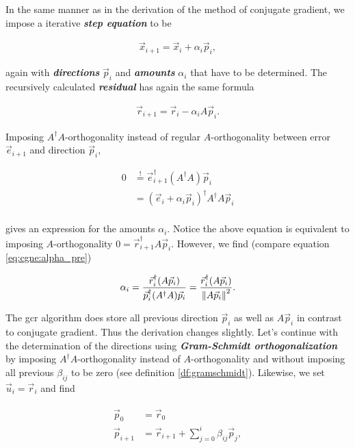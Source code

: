 \documentclass{article}
\theoremstyle{plain} %
\theoremstyle{convention} %
\theoremstyle{remark} %
\def\df#1{\textbf{\textit{#1}}}
\numberwithin{equation}{section}
\begin{document}
In the same manner as in the derivation of the method of conjugate gradient, we impose a iterative \df{step equation} to be

\begin{align*}
    \vec{x}_{i+1} = \vec{x}_i + \alpha_i \vec{p}_i,
\end{align*}

again with \df{directions} $\vec{p}_i$ and \df{amounts} $\alpha_i$ that have to be determined. The recursively calculated \df{residual} has again the same formula

\begin{align*}
    \vec{r}_{i+1} = \vec{r}_i - \alpha_i A \vec{p}_i.
\end{align*}

Imposing $A^{\dagger} A$-orthogonality instead of regular $A$-orthogonality between error $\vec{e}_{i+1}$ and direction $\vec{p}_i$,

\begin{align*}
    0 &\stackrel{!}{=} \vec{e}_{i+1}^{\dagger} (A^{\dagger} A) \vec{p}_i \\
                    &= ( \vec{e}_{i} + \alpha_i \vec{p}_i )^{\dagger} A^{\dagger} A \vec{p}_i \\
\end{align*}

gives an expression for the amounts $\alpha_i$. Notice the above equation is equivalent to imposing $A$-orthogonality $0=\vec{r}_{i+1}^{\dagger} A \vec{p}_i$. However, we find (compare equation \eqref{eq:cgne:alpha_pre})

\begin{align*}
      \alpha_i = \frac{ \vec{r}_i^{\dagger} (A \vec{p}_{i}) }{ \vec{p}_i^{\dagger} (A^{\dagger} A) \vec{p}_i } = \frac{ \vec{r}_i^{\dagger} (A \vec{p}_{i}) }{ \norm{A \vec{p}_i}^2 }.
\end{align*}

The \acrshort{gcr} algorithm does store all previous direction $\vec{p}_i$ as well as $A \vec{p}_i$ in contrast to conjugate gradient. Thus the derivation changes slightly. Let's continue with the determination of the directions using \df{Gram-Schmidt orthogonalization} by imposing $A^{\dagger} A$-orthogonality instead of $A$-orthogonality and without imposing all previous $\beta_{ij}$ to be zero (see definition \ref{df:gramschmidt}). Likewise, we set $\vec{u}_i = \vec{r}_i$ and find

\begin{align*}
    \begin{split}
        \vec{p}_0 &= \vec{r}_0 \\
        \vec{p}_{i+1} &= \vec{r}_{i+1} + \sum_{j=0}^{i} \beta_{ij} \vec{p}_j,
    \end{split}
\end{align*}
\end{document}
